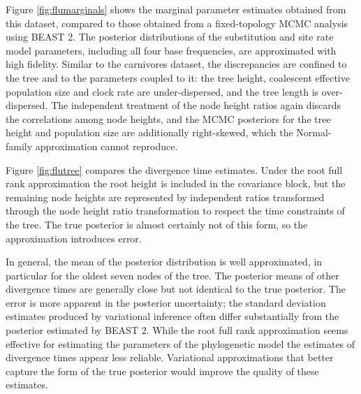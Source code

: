 \documentclass[oupdraft]{sysbio_sse}
\begin{document}
Figure \ref{fig:flumarginals} shows the marginal parameter estimates obtained from this dataset, compared to those obtained from a fixed-topology MCMC analysis using BEAST 2. The posterior distributions of the substitution and site rate model parameters, including all four base frequencies, are approximated with high fidelity. Similar to the carnivores dataset, the discrepancies are confined to the tree and to the parameters coupled to it: the tree height, coalescent effective population size and clock rate are under-dispersed, and the tree length is over-dispersed. The independent treatment of the node height ratios again discards the correlations among node heights, and the MCMC posteriors for the tree height and population size are additionally right-skewed, which the Normal-family approximation cannot reproduce.

Figure \ref{fig:flutree} compares the divergence time estimates. Under the root full rank approximation the root height is included in the covariance block, but the remaining node heights are represented by independent ratios transformed through the node height ratio transformation to respect the time constraints of the tree. The true posterior is almost certainly not of this form, so the approximation introduces error.

In general, the mean of the posterior distribution is well approximated, in particular for the oldest seven nodes of the tree. The posterior means of other divergence times are generally close but not identical to the true posterior. The error is more apparent in the posterior uncertainty; the standard deviation estimates produced by variational inference often differ substantially from the posterior estimated by BEAST 2. While the root full rank approximation seems effective for estimating the parameters of the phylogenetic model the estimates of divergence times appear less reliable. Variational approximations that better capture the form of the true posterior would improve the quality of these estimates.
\end{document}
